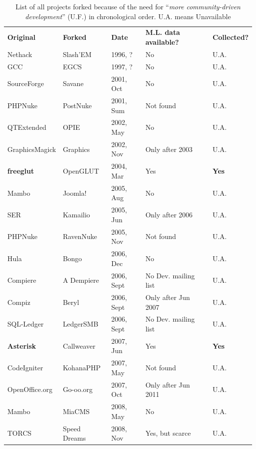 \documentclass[11pt]{report}
\begin{document}
\begin{table}
\centering
\caption[List of all projects forked because of the need for ``\textit{more community-driven development}'' (U.F.)]{List of all projects forked because of the need for ``\textit{more community-driven development}'' (U.F.) \cite{Robles} in chronological order. U.A. means Unavailable}
\label{tableProjectsForkedCat2CommunityDriven}
\begin{tabular}{m{} m{} m{} m{} m{}}
\hline\noalign{\smallskip}
\textbf{Original} & \textbf{Forked} & \textbf{Date} & \textbf{M.L. data available?} & \textbf{Collected?}\\
\noalign{\smallskip}\hline\noalign{\smallskip}
Nethack & Slash'EM & 1996, ? & No & U.A. \\ \hline
GCC & EGCS & 1997, ? & No & U.A. \\ \hline
SourceForge & Savane & 2001, Oct & No & U.A. \\ \hline
PHPNuke & PostNuke & 2001, Sum & Not found & U.A. \\ \hline
QTExtended & OPIE & 2002, May & No & U.A. \\ \hline
GraphicsMagick & Graphics & 2002, Nov  & Only after 2003 & U.A. \\ \hline
\textbf{freeglut} & OpenGLUT & 2004, Mar & Yes & \textbf{Yes} \\ \hline
Mambo & Joomla! & 2005, Aug & No & U.A. \\ \hline
SER & Kamailio & 2005, Jun & Only after 2006 & U.A. \\ \hline
PHPNuke & RavenNuke & 2005, Nov & Not found & U.A. \\ \hline
Hula & Bongo & 2006, Dec & No & U.A. \\ \hline
Compiere & A Dempiere & 2006, Sept & No Dev. mailing list & U.A. \\ \hline
Compiz & Beryl & 2006, Sept & Only after Jun 2007 & U.A. \\ \hline
SQL-Ledger & LedgerSMB & 2006, Sept & No Dev. mailing list & U.A. \\ \hline
\textbf{Asterisk} & Callweaver & 2007, Jun & Yes & \textbf{Yes} \\ \hline
CodeIgniter & KohanaPHP & 2007, May & Not found & U.A. \\ \hline
OpenOffice.org & Go-oo.org & 2007, Oct & Only after Jun 2011 & U.A. \\ \hline
Mambo & MiaCMS & 2008, May & No & U.A. \\ \hline
TORCS & Speed Dreams & 2008, Nov & Yes, but scarce & U.A. \\ \hline

\end{tabular}
\end{table}
\end{document}

